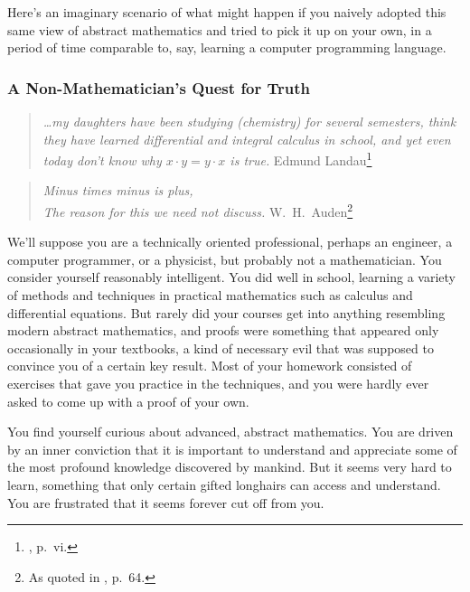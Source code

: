 Here's an imaginary scenario of what might happen if you na\-ive\-ly a\-dopted
this same view of abstract mathematics and tried to pick it up on your own, in
a period of time comparable to, say, learning a computer programming
language.

\subsubsection{A Non-Mathematician's Quest for Truth}

\begin{quote}
  {\em \ldots my daughters have been studying (chemistry) for several
se\-mes\-ters, think they have learned differential and integral calculus in
school, and yet even today don't know why $x\cdot y=y\cdot x$ is true.}
  \flushright\sc  Edmund Landau\footnote{\cite{Landau}, p.~vi.}\\
\end{quote}

\begin{quote}
  {\em Minus times minus is plus,\\
The reason for this we need not discuss.}
  \flushright\sc W.\ H.\ Auden\footnote{As quoted in \cite{Guillen}, p.~64.}\\
\end{quote}

We'll suppose you are a technically oriented professional, perhaps an engineer, a
computer programmer, or a physicist, but probably not a mathematician.  You
consider yourself reasonably intelligent.  You did well in school, learning a
variety of methods and techniques in practical mathematics such as calculus and
differential equations.  But rarely did your courses get into anything
resembling modern abstract mathematics, and proofs were something that appeared
only occasionally in your textbooks, a kind of necessary evil that was
supposed to convince you of a certain key result.  Most of your
homework consisted of exercises that gave you practice in the techniques, and
you were hardly ever asked to come up with a proof of your own.

You find yourself curious about advanced, abstract mathematics.  You are
driven by an inner conviction that it is important to understand and
appreciate some of the most profound knowledge discovered by mankind.  But it
seems very hard to learn, something that only certain gifted longhairs can
access and understand.  You are frustrated that it seems forever cut off from
you.

